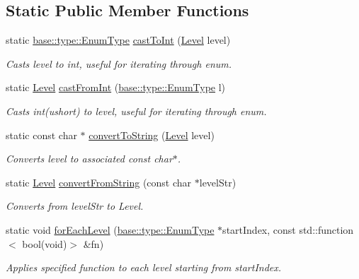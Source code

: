 \subsection*{Static Public Member Functions}
\begin{DoxyCompactItemize}
\item 
static \hyperlink{namespaceel_1_1base_1_1type_afb892a99b7545bf6e45c1e1d84af2ec9}{base\+::type\+::\+Enum\+Type} \hyperlink{classel_1_1_level_helper_a6576fd7cd6d1d839952145115c6e4b38}{cast\+To\+Int} (\hyperlink{namespaceel_ab0ac6091262344c52dd2d3ad099e8e36}{Level} level)
\begin{DoxyCompactList}\small\item\em Casts level to int, useful for iterating through enum. \end{DoxyCompactList}\item 
static \hyperlink{namespaceel_ab0ac6091262344c52dd2d3ad099e8e36}{Level} \hyperlink{classel_1_1_level_helper_a1279f27df29a003df5ecc3d0bf4dacbb}{cast\+From\+Int} (\hyperlink{namespaceel_1_1base_1_1type_afb892a99b7545bf6e45c1e1d84af2ec9}{base\+::type\+::\+Enum\+Type} l)
\begin{DoxyCompactList}\small\item\em Casts int(ushort) to level, useful for iterating through enum. \end{DoxyCompactList}\item 
static const char $\ast$ \hyperlink{classel_1_1_level_helper_a53b3e226a09af6e87c2072c115b3ba1a}{convert\+To\+String} (\hyperlink{namespaceel_ab0ac6091262344c52dd2d3ad099e8e36}{Level} level)
\begin{DoxyCompactList}\small\item\em Converts level to associated const char$\ast$. \end{DoxyCompactList}\item 
static \hyperlink{namespaceel_ab0ac6091262344c52dd2d3ad099e8e36}{Level} \hyperlink{classel_1_1_level_helper_a4ff401c62931609c849d580fb6ad2028}{convert\+From\+String} (const char $\ast$level\+Str)
\begin{DoxyCompactList}\small\item\em Converts from level\+Str to Level. \end{DoxyCompactList}\item 
static void \hyperlink{classel_1_1_level_helper_a94449b79778145f4c58fd1da6bcaf45d}{for\+Each\+Level} (\hyperlink{namespaceel_1_1base_1_1type_afb892a99b7545bf6e45c1e1d84af2ec9}{base\+::type\+::\+Enum\+Type} $\ast$start\+Index, const std\+::function$<$ bool(void)$>$ \&fn)
\begin{DoxyCompactList}\small\item\em Applies specified function to each level starting from start\+Index. \end{DoxyCompactList}\end{DoxyCompactItemize}
